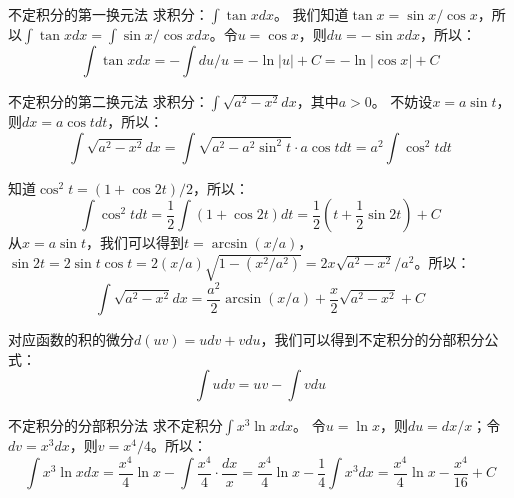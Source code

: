 \begin{example}{不定积分的第一换元法}{}
    求积分：$\int \tan x dx$。
    \tcblower
    我们知道$\tan x = \sin x / \cos x$，所以$\int \tan x dx = \int \sin x / \cos x dx$。令$u = \cos x$，则$du = -\sin x dx$，所以：
    \begin{equation}
        \int \tan x dx = -\int du / u = -\ln |u| + C = -\ln |\cos x| + C
    \end{equation}
\end{example}

\begin{example}{不定积分的第二换元法}{}
    求积分：$\int \sqrt{a^2 - x^2} dx$，其中$a > 0$。
    \tcblower
    不妨设$x = a \sin t$，则$dx = a \cos t dt$，所以：
    \begin{equation}
        \int \sqrt{a^2 - x^2} dx = \int \sqrt{a^2 - a^2 \sin^2 t} \cdot a \cos t dt = a^2 \int \cos^2 t dt
    \end{equation}

    知道$\cos^2 t = (1 + \cos 2t)/2$，所以：
    \begin{equation}
        \int \cos^2 t dt = \frac{1}{2} \int (1 + \cos 2t) dt = \frac{1}{2} (t + \frac{1}{2} \sin 2t) + C
    \end{equation}
    从$x = a \sin t$，我们可以得到$t = \arcsin(x/a)$，$\sin 2t = 2 \sin t \cos t = 2 (x/a) \sqrt{1 - (x^2 / a^2)} = 2x \sqrt{a^2 - x^2} / a^2$。所以：
    \begin{equation}
        \int \sqrt{a^2 - x^2} dx = \frac{a^2}{2} \arcsin(x/a) + \frac{x}{2} \sqrt{a^2 - x^2} + C
    \end{equation}
\end{example}

对应函数的积的微分$d(uv) = u dv + v du$，我们可以得到不定积分的分部积分公式：
\begin{equation}
    \int u dv = uv - \int v du
\end{equation}

\begin{example}{不定积分的分部积分法}{}
    求不定积分$\int x^3 \ln x dx$。
    \tcblower
    令$u = \ln x$，则$du = dx / x$；令$dv = x^3 dx$，则$v = x^4 / 4$。所以：
    \begin{equation}
        \int x^3 \ln x dx = \frac{x^4}{4} \ln x - \int \frac{x^4}{4} \cdot \frac{dx}{x} = \frac{x^4}{4} \ln x - \frac{1}{4} \int x^3 dx = \frac{x^4}{4} \ln x - \frac{x^4}{16} + C
    \end{equation}
\end{example}

